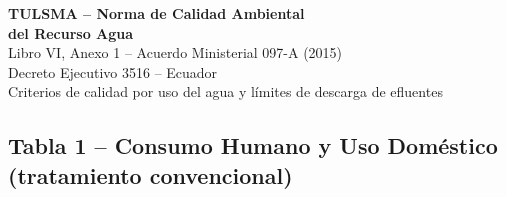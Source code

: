\documentclass[12pt,a4paper]{article}
\begin{document}
\begin{center}
{\LARGE\bfseries TULSMA -- Norma de Calidad Ambiental\\[4pt]
del Recurso Agua}\\[8pt]
{\large Libro VI, Anexo 1 -- Acuerdo Ministerial 097-A (2015)\\
Decreto Ejecutivo 3516 -- Ecuador}\\[4pt]
{\small Criterios de calidad por uso del agua y l\'imites de descarga de efluentes}
\end{center}
\vspace{10pt}

\subsection{Tabla 1 -- Consumo Humano y Uso Dom\'estico (tratamiento convencional)}
\end{document}
